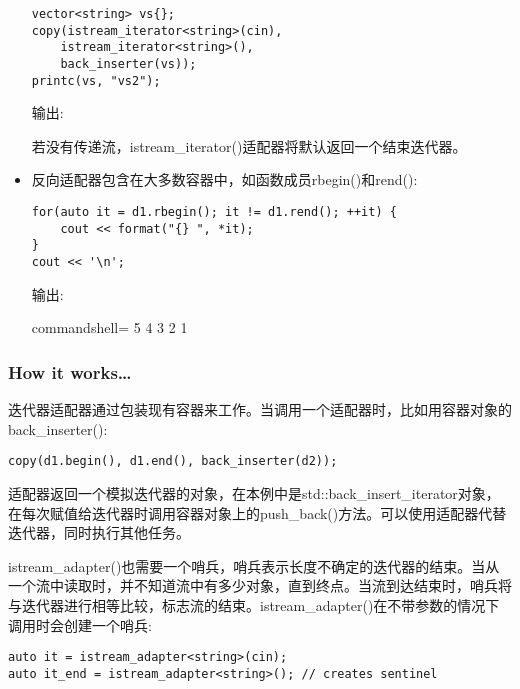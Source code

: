 \begin{itemize}
\begin{lstlisting}[style=styleCXX]
vector<string> vs{};
copy(istream_iterator<string>(cin),
	istream_iterator<string>(),
	back_inserter(vs));
printc(vs, "vs2");
\end{lstlisting}

输出:


若没有传递流，istream\_iterator()适配器将默认返回一个结束迭代器。

\item 
反向适配器包含在大多数容器中，如函数成员rbegin()和rend():

\begin{lstlisting}[style=styleCXX]
for(auto it = d1.rbegin(); it != d1.rend(); ++it) {
	cout << format("{} ", *it);
}
cout << '\n';
\end{lstlisting}

输出:

\begin{tcblisting}{commandshell={}}
5 4 3 2 1
\end{tcblisting}
\end{itemize}

\subsubsection{How it works…}

迭代器适配器通过包装现有容器来工作。当调用一个适配器时，比如用容器对象的back\_inserter():

\begin{lstlisting}[style=styleCXX]
copy(d1.begin(), d1.end(), back_inserter(d2));
\end{lstlisting}

适配器返回一个模拟迭代器的对象，在本例中是std::back\_insert\_iterator对象，在每次赋值给迭代器时调用容器对象上的push\_back()方法。可以使用适配器代替迭代器，同时执行其他任务。

istream\_adapter()也需要一个哨兵，哨兵表示长度不确定的迭代器的结束。当从一个流中读取时，并不知道流中有多少对象，直到终点。当流到达结束时，哨兵将与迭代器进行相等比较，标志流的结束。istream\_adapter()在不带参数的情况下调用时会创建一个哨兵:

\begin{lstlisting}[style=styleCXX]
auto it = istream_adapter<string>(cin);
auto it_end = istream_adapter<string>(); // creates sentinel
\end{lstlisting}

